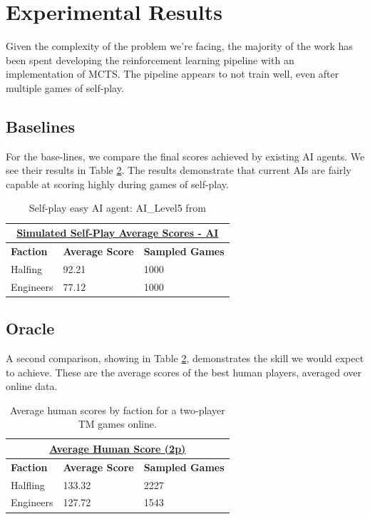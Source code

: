 \documentclass[10pt,twocolumn,letterpaper]{article}
\begin{document}
\section{Experimental Results}
Given the complexity of the problem we're facing, the majority of the work has been spent developing the reinforcement learning pipeline with an implementation of MCTS. The pipeline appears to not train well, even after multiple games of self-play.

\subsection{Baselines}
For the base-lines, we compare the final scores achieved by existing AI agents. We see their results in Table \ref{table:average_2p_score}. The results demonstrate that current AIs are fairly capable at scoring highly during games of self-play.


\begin{table}[!ht]
\begin{tabular}{|l|l|l|}
\hline
\multicolumn{3}{|c|}{{\ul \textbf{Simulated Self-Play Average Scores - AI}}}      \\ \hline
\textbf{Faction} & \textbf{Average Score} & \textbf{Sampled Games} \\ \hline
Halfing          & 92.21                 & 1000                   \\ \hline
Engineers        & 77.12                 & 1000                   \\ \hline
\end{tabular}
\caption{Self-play easy AI agent: AI\_Level5 from \cite{TMStatsAI}}
\label{table:average_2p_score_ai}
\end{table}

\subsection{Oracle}
A second comparison, showing in Table \ref{table:average_2p_score}, demonstrates the skill we would expect to achieve. These are the average scores of the best human players, averaged over online data.

\begin{table}[!ht]
\begin{tabular}{|l|l|l|}
\hline
\multicolumn{3}{|c|}{{\ul \textbf{Average Human Score (2p)}}}      \\ \hline
\textbf{Faction} & \textbf{Average Score} & \textbf{Sampled Games} \\ \hline
Halfling          & 133.32                 & 2227                   \\ \hline
Engineers        & 127.72                 & 1543                   \\ \hline
\end{tabular}
\caption{Average human scores by faction for a two-player TM games online.}
\label{table:average_2p_score}
\end{table}
\end{document}
